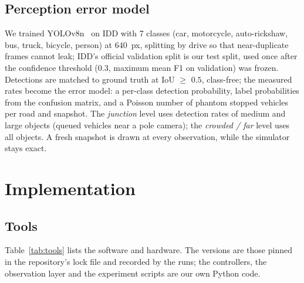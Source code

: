 \documentclass[conference]{IEEEtran}
\newcommand{\V}[2]{\ensuremath{#2}}
\begin{document}
\subsection{Perception error model}\label{sec:perc}
We trained YOLOv8n~\cite{jocher2023yolov8} on IDD with 7 classes (car, motorcycle,
auto-rickshaw, bus, truck, bicycle, person) at \V{cfg.imgsz}{640}~px, splitting by drive so
that near-duplicate frames cannot leak; IDD's official validation split is our test split,
used once after the confidence threshold (\V{d.conf}{0.3}, maximum mean F1 on validation) was
frozen. Detections are matched to ground truth at IoU $\ge$ \V{d.match_iou}{0.5}, class-free;
the measured rates become the error model: a per-class detection probability, label
probabilities from the confusion matrix, and a Poisson number of phantom stopped vehicles per
road and snapshot. The \emph{junction} level uses detection rates of medium and large objects
(queued vehicles near a pole camera); the \emph{crowded / far} level uses all objects. A fresh
snapshot is drawn at every observation, while the simulator stays exact.

\section{Implementation}\label{sec:impl}

\subsection{Tools}
Table~\ref{tab:tools} lists the software and hardware. The versions are those pinned in the
repository's lock file and recorded by the runs; the controllers, the observation layer and
the experiment scripts are our own Python code.
\end{document}
